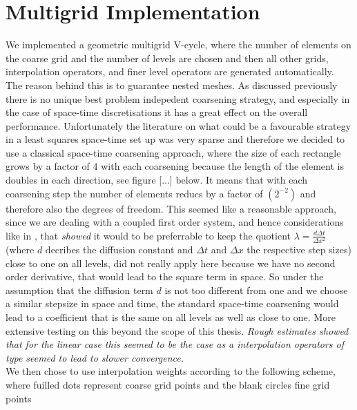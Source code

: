 \documentclass[../draft_1.tex]{subfiles}
\begin{document}
\section{Multigrid Implementation}
We implemented a geometric multigrid V-cycle, where the number of elements on the coarse grid and the number of levels are chosen and then all other grids, interpolation operators, and finer level operators are generated automatically. The reason behind this is to guarantee nested meshes. As discussed previously there is no unique best problem indepedent coarsening strategy, and especially in the case of space-time discretisations it has a great effect on the overall performance. Unfortunately the literature on what could be a favourable strategy in a least squares space-time set up was very sparse and therefore we decided to use a classical space-time coarsening approach, where the size of each rectangle grows by a factor of 4 with each coarsening because the length of the element is doubles in each direction, see figure [...] below. It means that with each coarsening step the number of elements reducs by a factor of $(2^{-2})$ and therefore also the degrees of freedom. This seemed like a reasonable approach, since we are dealing with a coupled first order system, and hence considerations like in \cite{gander2016analysis}, that \textit{showed} it would to be preferrable to keep the quotient $\lambda = \frac{d \Delta t}{\Delta x^2}$ (where $d$ decribes the diffusion constant and $\Delta t$ and $\Delta x$ the respective step sizes) close to one on all levels, did not really apply here because we have no second order derivative, that would lead to the square term in space. So under the assumption that the diffusion term $d$ is not too different from one and we choose a similar stepsize in space and time, the standard space-time coarsening would lead to a coefficient that is the same on all levels as well as close to one. More extensive testing on this beyond the scope of this thesis. \textit{Rough estimates showed that for the linear case this seemed to be the case as a interpolation operators of type \cite{gander2016analysis} seemed to lead to slower convergence.} 
\smallskip
\\
We then chose to use interpolation weights according to the following scheme, where fuilled dots represent coarse grid points and the blank circles fine grid points \\
\end{document}
